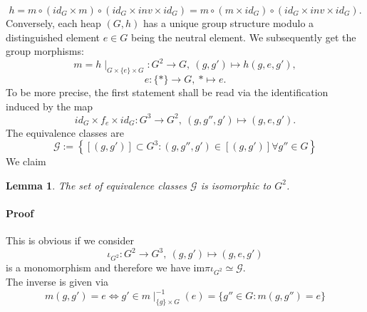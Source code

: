 \documentclass[10pt,a4paper]{article}
\newtheorem{lemm}{Lemma}
\newcommand{\bws}{\paragraph{Proof}}
\begin{document}
$$h = m \circ (id_G \times m)\circ (id_G \times inv \times id_G) = m \circ (m \times id_G)\circ(id_G \times inv \times id_G).$$
Conversely, each heap $(G, h)$ has a unique group structure modulo a distinguished element $e \in G$ being the neutral element. We subsequently get the group morphisms:
$$m = h\mid_{G \times \{e\} \times G} : G^2 \longrightarrow G,\ (g,g') \longmapsto h(g,e,g'),$$
$$e : \{\ast\} \longrightarrow G,\ \ast \longmapsto e.$$
To be more precise, the first statement shall be read via the identification induced by the map
$$id_G \times f_e \times id_G : G^3 \longrightarrow G^2,\ (g, g'', g') \longmapsto (g, e, g').$$
The equivalence classes are
$$\mathcal{G} := \left\{[(g,g')] \subset G^3: (g,g'',g') \in [(g,g')] \forall g'' \in G\right\}$$ 
We claim
\begin{lemm}
The set of equivalence classes $\mathcal{G}$ is isomorphic to $G^2$.
\end{lemm}
\bws This is obvious if we consider
$$\iota_{G^2} : G^2 \longrightarrow G^3,\ (g,g') \longmapsto (g,e,g')$$
is a monomorphism and therefore we have $\mathrm{im} \pi \iota_{G^2} \simeq \mathcal{G}$.\\
The inverse is given via
$$m(g,g') = e \Leftrightarrow g' \in m\mid_{\{g\}\times G}^{-1}(e) = \{g'' \in G: m(g,g'') = e\}$$
\end{document}
